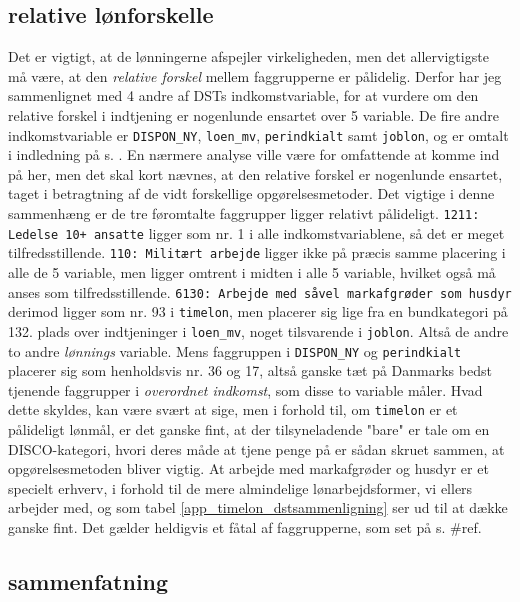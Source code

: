 \subsection{relative lønforskelle \label{app_relativloen}}


Det er vigtigt, at de lønningerne afspejler virkeligheden, men det allervigtigste må være, at den \emph{relative forskel} mellem faggrupperne er pålidelig. Derfor har jeg sammenlignet med 4 andre af DSTs indkomstvariable, for at vurdere om den relative forskel i indtjening er nogenlunde ensartet over 5 variable. De fire andre indkomstvariable 
er \texttt{DISPON\_NY}, \texttt{loen\_mv}, \texttt{perindkialt} samt \texttt{joblon}, og er omtalt i indledning på s. . En nærmere analyse ville være for omfattende at komme ind på her, men det skal kort nævnes, at den relative forskel er nogenlunde ensartet, taget i betragtning af de vidt forskellige opgørelsesmetoder. Det vigtige i denne sammenhæng er de tre føromtalte faggrupper ligger relativt pålideligt. \texttt{1211: Ledelse 10+ ansatte} ligger som nr. 1 i alle indkomstvariablene, så det er meget tilfredsstillende. \texttt{110: Militært arbejde} ligger ikke på præcis samme placering i alle de 5 variable, men ligger omtrent i midten i alle 5 variable, hvilket også må anses som tilfredsstillende. \texttt{6130: Arbejde med såvel markafgrøder som husdyr} derimod ligger som nr. 93 i \texttt{timelon}, men placerer sig lige fra en bundkategori på 132. plads over indtjeninger i \texttt{loen\_mv}, noget tilsvarende i \texttt{joblon}. Altså de andre to andre \emph{lønnings} variable. Mens faggruppen i \texttt{DISPON\_NY} og \texttt{perindkialt} placerer sig som henholdsvis nr. 36 og 17, altså ganske tæt på Danmarks bedst tjenende faggrupper i \emph{overordnet indkomst}, som disse to variable måler. Hvad dette skyldes, kan være svært at sige, men i forhold til, om \texttt{timelon} er et pålideligt lønmål, er det ganske fint, at der tilsyneladende "bare" er tale om en DISCO-kategori, hvori deres måde at tjene penge på er sådan skruet sammen, at opgørelsesmetoden bliver vigtig. At arbejde med markafgrøder og husdyr er et specielt erhverv, i forhold til de mere almindelige lønarbejdsformer, vi ellers arbejder med, og som tabel \ref{app_timelon_dstsammenligning} ser ud til at dække ganske fint. Det gælder heldigvis et fåtal af faggrupperne, som set på s. \#ref. 

\subsection{sammenfatning \label{app_indksammenfatning}}

